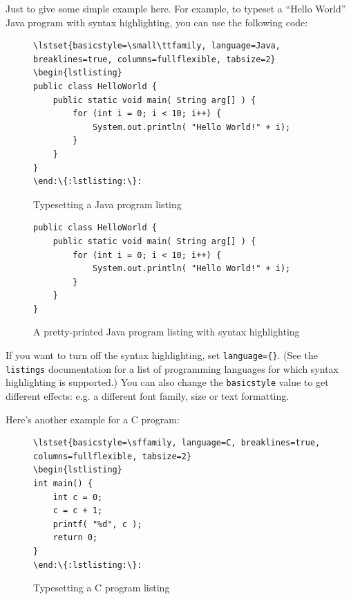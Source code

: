 Just to give some simple example here.  For example, to typeset a ``Hello World'' Java program with syntax highlighting, you can use the following code:

\begin{figure}[hbt!]
\begin{lstlisting}[escapechar=:,language={}]
\lstset{basicstyle=\small\ttfamily, language=Java, breaklines=true, columns=fullflexible, tabsize=2}
\begin{lstlisting}
public class HelloWorld {
	public static void main( String arg[] ) {
        for (int i = 0; i < 10; i++) {
			System.out.println( "Hello World!" + i);
		}
	}
}
\end:\{:lstlisting:\}:
\end{lstlisting}
\caption{Typesetting a Java program listing}\label{fig:lst:syntax}
\end{figure}

\begin{figure}[hbt!]
\lstset{basicstyle=\small\ttfamily, language=Java, breaklines=true, columns=fullflexible, framesep=10pt, xleftmargin=16pt, tabsize=2}
\begin{lstlisting}
public class HelloWorld {
	public static void main( String arg[] ) {
        for (int i = 0; i < 10; i++) {
			System.out.println( "Hello World!" + i);
		}
	}
}
\end{lstlisting}
\caption{A pretty-printed Java program listing with syntax highlighting}
\end{figure}


If you want to turn off the syntax highlighting, set \verb|language={}|.  (See the \verb|listings| documentation for a list of programming languages for which syntax highlighting is supported.)  You can also change the \verb|basicstyle| value to get different effects: e.g. a different font family, size or text formatting.

Here's another example for a C program:

\begin{figure}[hbt!]
\begin{lstlisting}[escapechar={:}, texcl=false,language={}]
\lstset{basicstyle=\sffamily, language=C, breaklines=true, columns=fullflexible, tabsize=2}
\begin{lstlisting}
int main() {
	int c = 0;
	c = c + 1;
	printf( "%d", c );
	return 0;
}
\end:\{:lstlisting:\}:
\end{lstlisting}
\caption{Typesetting a C program listing}\label{fig:lst:c}
\end{figure}

